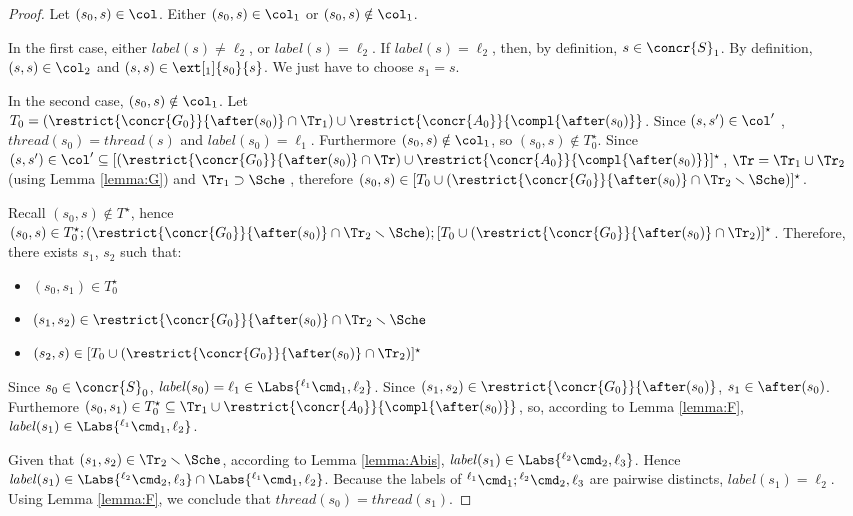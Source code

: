 \documentclass[12pt]{article}
\let\firstunion\cup
\let\firstinter\cap
\let\cup\firstunion
\let\cap\firstinter
\renewcommand{\subset}{\subseteq}
\newcommand{\li}[1]{ {}^{\ell_{#1}}  }
\newcounter{labels}[figure]
\newcommand{\lbl}{\mathit{label}}
\newcommand{\thread}{\mathit{thread}}
\begin{document}
 \begin{proof}
 Let \((s_0,s)\in\col\).
 Either \((s_0,s)\in\col_1\) or \((s_0,s)\notin\col_1\).
 
 In the first case, either \(\lbl(s)\neq\ell_2\), or \(\lbl(s)=\ell_2\). If \(\lbl(s)=\ell_2\), then, by definition, \(s\in\concr{S}_1\). By definition, \((s,s)\in\col_2\) and \((s,s)\in\ext[_1]{s_0}{s} \). We just have to choose \(s_1=s\).
 
 In the second case, \((s_0,s)\notin\col_1\). Let \(T_0 = (\restrict{\concr{G_0}}{\after(s_0)}\cap\Tr_1)\cup\restrict{\concr{A_0}}{\compl{\after(s_0)}}\).
 Since \((s,s')\in\col'\) , \(\thread(s_0)=\thread(s)\) and \(\lbl(s_0)=\ell_1\). Furthermore \((s_0,s)\notin \col_1\), so \((s_0,s)\notin T_0^{\star} \).
 Since \((s,s')\in\col'\subset [(\restrict{\concr{G_0}}{\after(s_0)}\cap\Tr)\cup\restrict{\concr{A_0}}{\compl{\after(s_0)}}]^{\star}  \), \(\Tr=\Tr_1\cup\Tr_2\) (using Lemma \ref{lemma:G})  and \(\Tr_1\supset\Sche\) , therefore \((s_0,s) \in [ T_0 \cup  (\restrict{\concr{G_0}}{\after(s_0)}\cap\Tr_2\smallsetminus \Sche)]^{\star}\).
 
 
 Recall \((s_0,s)\notin T^{\star}\), hence \((s_0,s)\in T_0^{\star};(\restrict{\concr{G_0}}{\after(s_0)}\cap\Tr_2\smallsetminus \Sche); [ T_0 \cup  (\restrict{\concr{G_0}}{\after(s_0)}\cap\Tr_2)]^{\star}\).
 Therefore, there exists \(s_1\), \(s_2\) such that:
 \begin{itemize}
  \item \((s_0,s_1)\in T_0^{\star}\)
  \item \((s_1,s_2)\in\restrict{\concr{G_0}}{\after(s_0)}\cap\Tr_2\smallsetminus \Sche \)
  \item \((s_2,s)\in [T_0 \cup  (\restrict{\concr{G_0}}{\after(s_0)}\cap\Tr_2)]^{\star}\)
\end{itemize}
 
 Since \(s_0\in\concr{S}_0\), \(\lbl(s_0)=\ell_1 \in\Labs{\li1\cmd_1,\ell_2} \).
Since \((s_1,s_2)\in\restrict{\concr{G_0}}{\after(s_0)}\), \(s_1\in\after(s_0)\). Furthemore \((s_0,s_1)\in T_0^{\star} \subset \Tr_1\cup\restrict{\concr{A_0}}{\compl{\after(s_0)}} \), so, according to Lemma \ref{lemma:F}, \(\lbl(s_1)\in\Labs{\li1\cmd_1,\ell_2}\).

Given that \((s_1,s_2)\in\Tr_2\smallsetminus\Sche\), according to Lemma \ref{lemma:Abis}, \(\lbl(s_1)\in\Labs{\li2\cmd_2,\ell_3}\).
Hence \(\lbl(s_1)\in\Labs{\li2\cmd_2,\ell_3}\cap \Labs{\li1\cmd_1,\ell_2}\). 
Because the labels of \(\li1\cmd_1;\li2\cmd_2,\ell_3\) are pairwise distincts, \(\lbl(s_1)=\ell_2 \). Using Lemma \ref{lemma:F}, we conclude that \(\thread(s_0)=\thread(s_1)\).


\end{proof}
\end{document}
